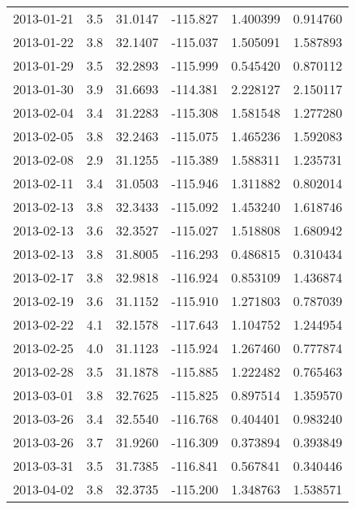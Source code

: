 \begin{tabular}{lrrrrr}
2013-01-21 &       3.5 &  31.0147 &  -115.827 &         1.400399 &         0.914760 \\
2013-01-22 &       3.8 &  32.1407 &  -115.037 &         1.505091 &         1.587893 \\
2013-01-29 &       3.5 &  32.2893 &  -115.999 &         0.545420 &         0.870112 \\
2013-01-30 &       3.9 &  31.6693 &  -114.381 &         2.228127 &         2.150117 \\
2013-02-04 &       3.4 &  31.2283 &  -115.308 &         1.581548 &         1.277280 \\
2013-02-05 &       3.8 &  32.2463 &  -115.075 &         1.465236 &         1.592083 \\
2013-02-08 &       2.9 &  31.1255 &  -115.389 &         1.588311 &         1.235731 \\
2013-02-11 &       3.4 &  31.0503 &  -115.946 &         1.311882 &         0.802014 \\
2013-02-13 &       3.8 &  32.3433 &  -115.092 &         1.453240 &         1.618746 \\
2013-02-13 &       3.6 &  32.3527 &  -115.027 &         1.518808 &         1.680942 \\
2013-02-13 &       3.8 &  31.8005 &  -116.293 &         0.486815 &         0.310434 \\
2013-02-17 &       3.8 &  32.9818 &  -116.924 &         0.853109 &         1.436874 \\
2013-02-19 &       3.6 &  31.1152 &  -115.910 &         1.271803 &         0.787039 \\
2013-02-22 &       4.1 &  32.1578 &  -117.643 &         1.104752 &         1.244954 \\
2013-02-25 &       4.0 &  31.1123 &  -115.924 &         1.267460 &         0.777874 \\
2013-02-28 &       3.5 &  31.1878 &  -115.885 &         1.222482 &         0.765463 \\
2013-03-01 &       3.8 &  32.7625 &  -115.825 &         0.897514 &         1.359570 \\
2013-03-26 &       3.4 &  32.5540 &  -116.768 &         0.404401 &         0.983240 \\
2013-03-26 &       3.7 &  31.9260 &  -116.309 &         0.373894 &         0.393849 \\
2013-03-31 &       3.5 &  31.7385 &  -116.841 &         0.567841 &         0.340446 \\
2013-04-02 &       3.8 &  32.3735 &  -115.200 &         1.348763 &         1.538571 \\

\end{tabular}
